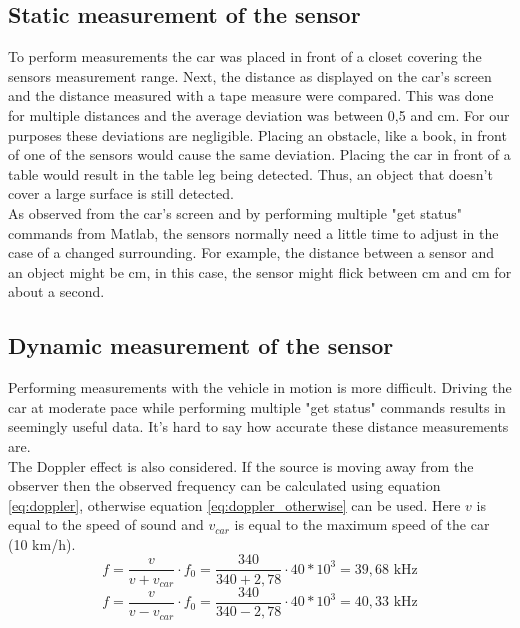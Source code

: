 \documentclass[final]{scrreprt} %
\begin{document}
\subsection{Static measurement of the sensor}

To perform measurements the car was placed in front of a closet covering the sensors measurement range. 
Next, the distance as displayed on the car's screen and the distance measured with a tape measure were compared. 
This was done for multiple distances and the average deviation was between 0,5 and \unit[1]{cm}. 
For our purposes these deviations are negligible. 
Placing an obstacle, like a book, in front of one of the sensors would cause the same deviation.
Placing the car in front of a table would result in the table leg being detected. 
Thus, an object that doesn't cover a large surface is still detected.\\ 
As observed from the car's screen and by performing multiple "get status" commands from Matlab, the sensors normally need a little time to adjust in the case of a changed surrounding. 
For example, the distance between a sensor and an object might be \unit[75]{cm}, in this case, the sensor might flick between \unit[75]{cm} and \unit[74]{cm} for about a second.


\subsection{Dynamic measurement of the sensor}

Performing measurements with the vehicle in motion is more difficult. Driving the car at moderate pace while performing multiple "get status" commands results in seemingly useful data. It's hard to say how accurate these distance measurements are.\\ The Doppler effect is also considered. If the source is moving away from the observer then the observed frequency can be calculated using equation \ref{eq:doppler}, otherwise equation \ref{eq:doppler_otherwise} can be used. Here $v$ is equal to the speed of sound and $v_{car}$ is equal to the maximum speed of the car (10 km/h).
\begin{equation} 
\label{eq:doppler}
f = \dfrac{v}{v+v_{car}} \cdot f_{0} = \dfrac{340}{340 + 2,78} \cdot {40*10^3} = 39,68 \text{ kHz}
\end{equation}
\begin{equation} 
\label{eq:doppler_otherwise}
f = \dfrac{v}{v-v_{car}} \cdot f_{0} = \dfrac{340}{340 - 2,78} \cdot {40*10^3} = 40,33 \text{ kHz}
\end{equation}
\end{document}
